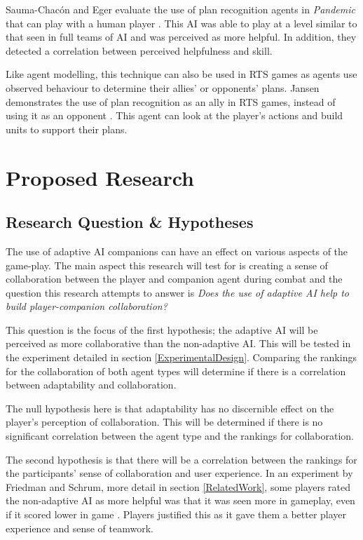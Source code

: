 \documentclass{IEEEtran}
\begin{document}
Sauma-Chacón and Eger evaluate the use of plan recognition agents in \textit{Pandemic} that can play with a human player \cite{PandemicPlanRecognition2021}. This AI was able to play at a level similar to that seen in full teams of AI and was perceived as more helpful. In addition, they detected a correlation between perceived helpfulness and skill.

Like agent modelling, this technique can also be used in RTS games as agents use observed behaviour to determine their allies' or opponents' plans. Jansen demonstrates the use of plan recognition as an ally in RTS games, instead of using it as an opponent \cite{PlayerAdaptiveRTSAI2007}. This agent can look at the player's actions and build units to support their plans.

\section{Proposed Research}
\label{ProposedResearch}

\subsection{Research Question \& Hypotheses}
\label{Hypotheses}

The use of adaptive AI companions can have an effect on various aspects of the game-play. The main aspect this research will test for is creating a sense of collaboration between the player and companion agent during combat and the question this research attempts to answer is \textit{Does the use of adaptive AI help to build player-companion collaboration?}

This question is the focus of the first hypothesis; the adaptive AI will be perceived as more collaborative than the non-adaptive AI. This will be tested in the experiment detailed in section \ref{ExperimentalDesign}. Comparing the rankings for the collaboration of both agent types will determine if there is a correlation between adaptability and collaboration.

The null hypothesis here is that adaptability has no discernible effect on the player's perception of collaboration. This will be determined if there is no significant correlation between the agent type and the rankings for collaboration.

The second hypothesis is that there will be a correlation between the rankings for the participants’ sense of collaboration and user experience. In an experiment by Friedman and Schrum, more detail in section \ref{RelatedWork}, some players rated the non-adaptive AI as more helpful was that it was seen more in gameplay, even if it scored lower in game \cite{CompanionBotsFPS2019}. Players justified this as it gave them a better player experience and sense of teamwork. 
\end{document}
